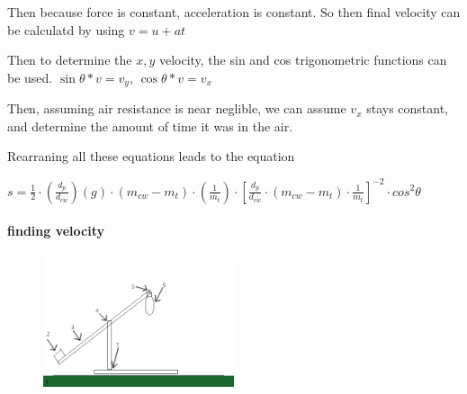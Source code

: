 \documentclass[12pt]{article}
\begin{document}
Then because force is constant, acceleration is constant. So then final velocity can be calculatd by using \(v = u + at\)

Then to determine the \(x, y\) velocity, the sin and cos trigonometric functions can be used. \(\sin{\theta}*v = v_{y}\), \(\cos{\theta}*v = v_{x}\)

Then, assuming air resistance is near neglible, we can assume \(v_{x}\) stays constant, and determine the amount of time it was in the air.

Rearraning all these equations leads to the equation

\(s = \frac{1}{2} \cdot ( \frac {d_{p}}{d_{cw}} )(g) \cdot (m_{cw} - m_{t}) \cdot (\frac {1}{m_{t}}) \cdot [ \frac{d_{p}}{d_{cw}} \cdot (m_{cw} - m_{t}) \cdot \frac{1}{m_{t}}]^{-2} \cdot cos^{2}\theta\)

\paragraph{finding velocity}
\begin{figure} %
  \centering
  \includegraphics[width=0.5\textwidth]{cataaa}
\end{figure}
\end{document}
